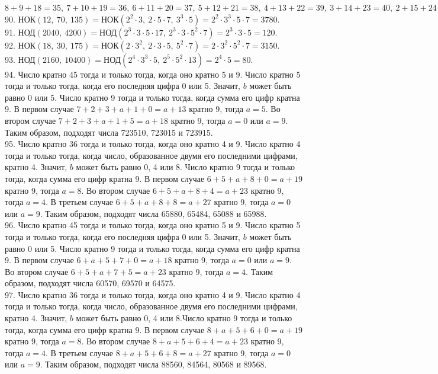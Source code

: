 \documentclass[12pt]{article}
\begin{document}
$8+9+18=35,\ 7+10+19=36,\ 6+11+20=37,\ 5+12+21=38,\ 4+13+22=39,\ 3+14+23=40,\ 2+15+24=41,\ 1+16+25=42.$\\
90. НОК$(12,\ 70,\ 135) =$НОК$(2^2\cdot3,\ 2\cdot5\cdot7,\ 3^3\cdot5)=2^2\cdot3^3\cdot5\cdot7=3780.$\\
91. НОД$(2040,\ 4200)=$НОД$(2^3\cdot3\cdot5\cdot17,\ 2^3\cdot3\cdot5^2\cdot7)=2^3\cdot3\cdot5=120.$\\
92. НОК$(18,\ 30,\ 175)=$НОК$(2\cdot3^2,\ 2\cdot3\cdot5,\ 5^2\cdot7)=2\cdot3^2\cdot5^2\cdot7=3150.$\\
93. НОД$(2160,\ 10400)=$НОД$(2^4\cdot3^3\cdot5,\ 2^5\cdot5^2\cdot13)=2^4\cdot5=80.$\\
94. Число кратно 45 тогда и только тогда, когда оно кратно 5 и 9. Число кратно 5 тогда и только тогда, когда его последняя цифра 0 или 5. Значит, $b$ может быть равно 0 или 5. Число кратно 9 тогда и только тогда, когда сумма его цифр кратна 9. В первом случае $7+2+3+a+1+0=a+13$ кратно 9, тогда $a=5.$ Во втором случае
$7+2+3+a+1+5=a+18$ кратно 9, тогда $a=0$ или $a=9.$ Таким образом, подходят числа 723510, 723015 и 723915.\\
95. Число кратно 36 тогда и только тогда, когда оно кратно 4 и 9. Число кратно 4 тогда и только тогда, когда число, образованное двумя его последними цифрами, кратно 4. Значит, $b$ может быть равно 0, 4 или 8. Число кратно 9 тогда и только тогда, когда сумма его цифр кратна 9. В первом случае $6+5+a+8+0=a+19$ кратно 9, тогда $a=8.$ Во втором случае $6+5+a+8+4=a+23$ кратно 9, тогда $a=4.$ В третьем случае $6+5+a+8+8=a+27$ кратно 9, тогда $a=0$ или $a=9.$ Таким образом, подходят числа 65880, 65484, 65088 и 65988.\\
96. Число кратно 45 тогда и только тогда, когда оно кратно 5 и 9. Число кратно 5 тогда и только тогда, когда его последняя цифра 0 или 5. Значит, $b$ может быть равно 0 или 5. Число кратно 9 тогда и только тогда, когда сумма его цифр кратна 9. В первом случае $6+a+5+7+0=a+18$ кратно 9, тогда $a=0$ или $a=9.$ Во втором случае $6+5+a+7+5=a+23$ кратно 9, тогда $a=4.$ Таким образом, подходят числа 60570, 69570 и 64575.\\
97. Число кратно 36 тогда и только тогда, когда оно кратно 4 и 9. Число кратно 4 тогда и только тогда, когда число, образованное двумя его последними цифрами, кратно 4. Значит, $b$ может быть равно 0, 4 или 8.Число кратно 9 тогда и только тогда, когда сумма его цифр кратна 9. В первом случае $8+a+5+6+0=a+19$ кратно 9, тогда $a=8.$ Во втором случае $8+a+5+6+4=a+23$ кратно 9, тогда $a=4.$ В третьем случае $8+a+5+6+8=a+27$ кратно 9, тогда $a=0$ или $a=9.$ Таким образом, подходят числа 88560, 84564, 80568 и 89568.\\
\end{document}
